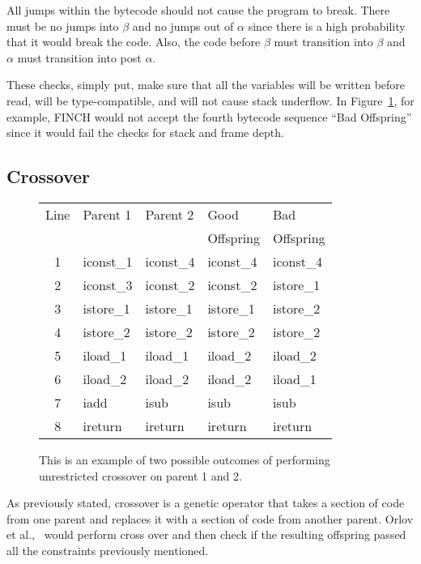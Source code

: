 \documentclass{sig-alternate}
\begin{document}
All jumps within the bytecode should not cause the program to break. There must be no jumps into $\beta$ and no jumps out of $\alpha$ since there is a high probability that it would break the code. Also, the code before $\beta$ must transition into $\beta$ and $\alpha$ must transition into post $\alpha$.\par

These checks, simply put, make sure that all the variables will be written before read, will be type-compatible, and will not cause stack underflow\cite{FINCH2:2009}. In Figure~\ref{crossover}, for example, FINCH would not accept the fourth bytecode sequence ``Bad Offspring'' since it would fail the checks for stack and frame depth.


\subsection{Crossover}

\begin{figure}
\begin{tabular}{|c|l|l|l|l|}

\hline
Line&Parent 1&Parent 2&Good&Bad\\  
 &         &         &Offspring&Offspring\\ \hline
1&iconst\_1&iconst\_4&iconst\_4&iconst\_4\\
2&iconst\_3&iconst\_2&iconst\_2&istore\_1\\
3&istore\_1&istore\_1&istore\_1&istore\_2\\
4&istore\_2&istore\_2&istore\_2&istore\_2\\
5&iload\_1&iload\_1&iload\_2&iload\_2\\
6&iload\_2&iload\_2&iload\_2&iload\_1\\
7&iadd&isub&isub&isub\\
8&ireturn&ireturn&ireturn&ireturn\\
\hline
\end{tabular}
\caption{This is an example of two possible outcomes of performing unrestricted crossover on parent 1 and 2.}
\label{crossover}
  
\end{figure}
As previously stated, crossover is a genetic operator that takes a section of code from one parent and replaces it with a section of code from another parent. Orlov et al.,~\cite{FINCH:2011} would perform cross over and then check if the resulting offspring passed all the constraints previously mentioned.\par 
\end{document}
